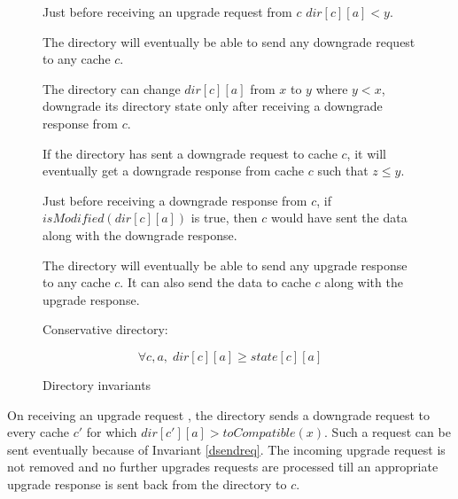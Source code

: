 \begin{figure}
\begin{inv}
Just before receiving an upgrade request  from $c$ $dir[c][a]
< y$.
\label{drecvreq}
\end{inv}
\begin{inv}
The directory will eventually be able to send any downgrade request to any cache
$c$.
\label{dsendreq}
\end{inv}
\begin{inv}
The directory can change $dir[c][a]$ from $x$ to $y$ where $y < x$, \ie
downgrade its directory state only after receiving a downgrade response
 from $c$.
\label{dwaitresp}
\end{inv}
\begin{inv}
If the directory has sent a downgrade request  to cache $c$,
it will eventually get a downgrade response  from cache $c$
such that $z \le y$.
\label{drecvresp}
\end{inv}
\begin{inv}
Just before receiving a downgrade response from $c$, if $isModified(dir[c][a])$
is true, then $c$ would have sent the data along with the downgrade response.
\label{drecvdata}
\end{inv}
\begin{inv}
The directory will eventually be able to send any upgrade response to any cache
$c$. It can also send the data to cache $c$ along with the upgrade response.
\label{dsendresp}
\end{inv}
\begin{inv}
Conservative directory:
\begin{spacing}{.1}
\begin{equation*}
\forall c, a,\; dir[c][a] \ge state[c][a]
\end{equation*}
\end{spacing}
\label{conservative}
\end{inv}
\caption{Directory invariants}
\label{DirInv}
\end{figure}

On receiving an upgrade request , the directory sends a
downgrade request  to every cache $c'$
for which $dir[c'][a] > toCompatible(x)$. Such a request can be sent eventually
because of Invariant \ref{dsendreq}. The incoming upgrade request is not
removed and no further upgrades requests are processed till an appropriate
upgrade response is sent back from the directory to $c$.

